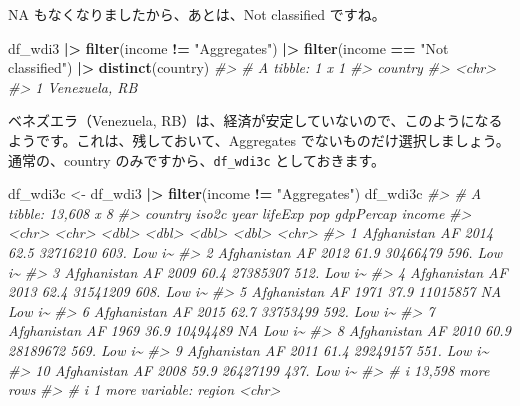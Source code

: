 \documentclass[
  xelatex, ja=standard]{bxjsbook}
\newenvironment{Shaded}{\begin{snugshade}}{\end{snugshade}}
\newcommand{\CommentTok}[1]{\textcolor[rgb]{0.56,0.35,0.01}{\textit{#1}}}
\newcommand{\FunctionTok}[1]{\textcolor[rgb]{0.13,0.29,0.53}{\textbf{#1}}}
\newcommand{\NormalTok}[1]{#1}
\newcommand{\OtherTok}[1]{\textcolor[rgb]{0.56,0.35,0.01}{#1}}
\newcommand{\SpecialCharTok}[1]{\textcolor[rgb]{0.81,0.36,0.00}{\textbf{#1}}}
\newcommand{\StringTok}[1]{\textcolor[rgb]{0.31,0.60,0.02}{#1}}
\theoremstyle{definition}
\theoremstyle{definition}
\theoremstyle{definition}
\theoremstyle{definition}
\theoremstyle{remark}
\begin{document}
NA もなくなりましたから、あとは、Not classified ですね。

\begin{Shaded}
\begin{Highlighting}[]
\NormalTok{df\_wdi3 }\SpecialCharTok{|\textgreater{}} \FunctionTok{filter}\NormalTok{(income }\SpecialCharTok{!=} \StringTok{"Aggregates"}\NormalTok{) }\SpecialCharTok{|\textgreater{}} 
  \FunctionTok{filter}\NormalTok{(income }\SpecialCharTok{==} \StringTok{"Not classified"}\NormalTok{) }\SpecialCharTok{|\textgreater{}} \FunctionTok{distinct}\NormalTok{(country) }
\CommentTok{\#\textgreater{} \# A tibble: 1 x 1}
\CommentTok{\#\textgreater{}   country      }
\CommentTok{\#\textgreater{}   \textless{}chr\textgreater{}        }
\CommentTok{\#\textgreater{} 1 Venezuela, RB}
\end{Highlighting}
\end{Shaded}

ベネズエラ（Venezuela, RB）は、経済が安定していないので、このようになるようです。これは、残しておいて、Aggregates でないものだけ選択しましょう。通常の、country のみですから、\texttt{df\_wdi3c} としておきます。

\begin{Shaded}
\begin{Highlighting}[]
\NormalTok{df\_wdi3c }\OtherTok{\textless{}{-}}\NormalTok{ df\_wdi3 }\SpecialCharTok{|\textgreater{}} \FunctionTok{filter}\NormalTok{(income }\SpecialCharTok{!=} \StringTok{"Aggregates"}\NormalTok{) }
\NormalTok{df\_wdi3c}
\CommentTok{\#\textgreater{} \# A tibble: 13,608 x 8}
\CommentTok{\#\textgreater{}    country     iso2c  year lifeExp      pop gdpPercap income}
\CommentTok{\#\textgreater{}    \textless{}chr\textgreater{}       \textless{}chr\textgreater{} \textless{}dbl\textgreater{}   \textless{}dbl\textgreater{}    \textless{}dbl\textgreater{}     \textless{}dbl\textgreater{} \textless{}chr\textgreater{} }
\CommentTok{\#\textgreater{}  1 Afghanistan AF     2014    62.5 32716210      603. Low i\textasciitilde{}}
\CommentTok{\#\textgreater{}  2 Afghanistan AF     2012    61.9 30466479      596. Low i\textasciitilde{}}
\CommentTok{\#\textgreater{}  3 Afghanistan AF     2009    60.4 27385307      512. Low i\textasciitilde{}}
\CommentTok{\#\textgreater{}  4 Afghanistan AF     2013    62.4 31541209      608. Low i\textasciitilde{}}
\CommentTok{\#\textgreater{}  5 Afghanistan AF     1971    37.9 11015857       NA  Low i\textasciitilde{}}
\CommentTok{\#\textgreater{}  6 Afghanistan AF     2015    62.7 33753499      592. Low i\textasciitilde{}}
\CommentTok{\#\textgreater{}  7 Afghanistan AF     1969    36.9 10494489       NA  Low i\textasciitilde{}}
\CommentTok{\#\textgreater{}  8 Afghanistan AF     2010    60.9 28189672      569. Low i\textasciitilde{}}
\CommentTok{\#\textgreater{}  9 Afghanistan AF     2011    61.4 29249157      551. Low i\textasciitilde{}}
\CommentTok{\#\textgreater{} 10 Afghanistan AF     2008    59.9 26427199      437. Low i\textasciitilde{}}
\CommentTok{\#\textgreater{} \# i 13,598 more rows}
\CommentTok{\#\textgreater{} \# i 1 more variable: region \textless{}chr\textgreater{}}
\end{Highlighting}
\end{Shaded}
\end{document}
